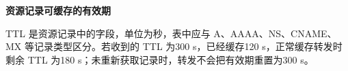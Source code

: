 {\color{ink}\bfseries 资源记录可缓存的有效期}\par\vspace{1bp}TTL 是资源记录中的字段，单位为秒，表中应与 A、AAAA、NS、CNAME、MX 等记录类型区分。若收到的 TTL 为300 s，已经缓存120 s，正常缓存转发时剩余 TTL 为180 s；未重新获取记录时，转发不会把有效期重置为300 s。
